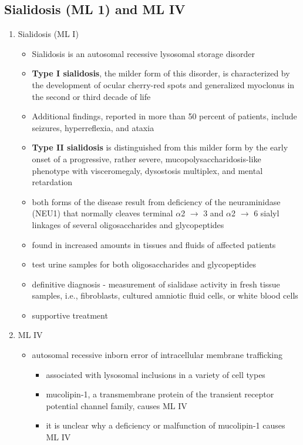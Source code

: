 \documentclass{scrartcl}
\begin{document}
\subsection{Sialidosis (ML 1) and ML IV}
\label{sec:orgf4aefe3}

\begin{enumerate}
\item Sialidosis (ML I)
\label{sec:org614c360}
\begin{itemize}
\item Sialidosis is an autosomal recessive lysosomal storage disorder
\item \textbf{Type I sialidosis}, the milder form of this disorder, is
characterized by the development of ocular cherry-red spots and
generalized myoclonus in the second or third decade of life
\item Additional findings, reported in more than 50 percent of patients,
include seizures, hyperreflexia, and ataxia

\item \textbf{Type II sialidosis} is distinguished from this milder form by the
early onset of a progressive, rather severe,
mucopolysaccharidosis-like phenotype with visceromegaly, dysostosis
multiplex, and mental retardation

\item both forms of the disease result from deficiency of the
neuraminidase (NEU1) that normally cleaves terminal \(\alpha\)2 \(\to\) 3 and
\(\alpha\)2 \(\to\) 6 sialyl linkages of several oligosaccharides and glycopeptides

\item found in increased amounts in tissues and fluids of affected patients

\item test urine samples for both oligosaccharides and glycopeptides

\item definitive diagnosis - measurement of sialidase activity in fresh tissue
samples, i.e., fibroblasts, cultured amniotic fluid cells, or white
blood cells

\item supportive treatment
\end{itemize}

\item ML IV
\label{sec:orga861555}

\begin{itemize}
\item autosomal recessive inborn error of intracellular membrane trafficking
\begin{itemize}
\item associated with lysosomal inclusions in a variety of cell types
\item mucolipin-1, a transmembrane protein of the transient receptor
potential channel family, causes ML IV
\item it is unclear why a deficiency or malfunction of mucolipin-1 causes ML IV
\end{itemize}


\end{itemize}
\end{enumerate}
\end{document}
